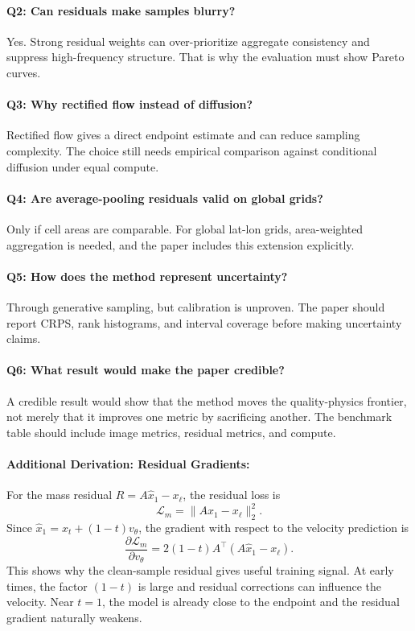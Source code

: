 \documentclass{article}
\begin{document}
\paragraph{Q2: Can residuals make samples blurry?}
Yes. Strong residual weights can over-prioritize aggregate consistency and suppress high-frequency structure. That is why the evaluation must show Pareto curves.

\paragraph{Q3: Why rectified flow instead of diffusion?}
Rectified flow gives a direct endpoint estimate and can reduce sampling complexity. The choice still needs empirical comparison against conditional diffusion under equal compute.

\paragraph{Q4: Are average-pooling residuals valid on global grids?}
Only if cell areas are comparable. For global lat-lon grids, area-weighted aggregation is needed, and the paper includes this extension explicitly.

\paragraph{Q5: How does the method represent uncertainty?}
Through generative sampling, but calibration is unproven. The paper should report CRPS, rank histograms, and interval coverage before making uncertainty claims.

\paragraph{Q6: What result would make the paper credible?}
A credible result would show that the method moves the quality-physics frontier, not merely that it improves one metric by sacrificing another. The benchmark table should include image metrics, residual metrics, and compute.

\paragraph{Additional Derivation: Residual Gradients:}

For the mass residual $R=A\hat{x}_1-x_{\ell}$, the residual loss is
\begin{equation}
  \mathcal{L}_{m}=\|A\hat{x}_1-x_{\ell}\|_2^2.
\end{equation}
Since $\hat{x}_1=x_t+(1-t)v_{\theta}$, the gradient with respect to the velocity prediction is
\begin{equation}
  \frac{\partial \mathcal{L}_{m}}{\partial v_{\theta}}
  =2(1-t)A^\top(A\hat{x}_1-x_{\ell}).
\end{equation}
This shows why the clean-sample residual gives useful training signal. At early times, the factor $(1-t)$ is large and residual corrections can influence the velocity. Near $t=1$, the model is already close to the endpoint and the residual gradient naturally weakens.
\end{document}
